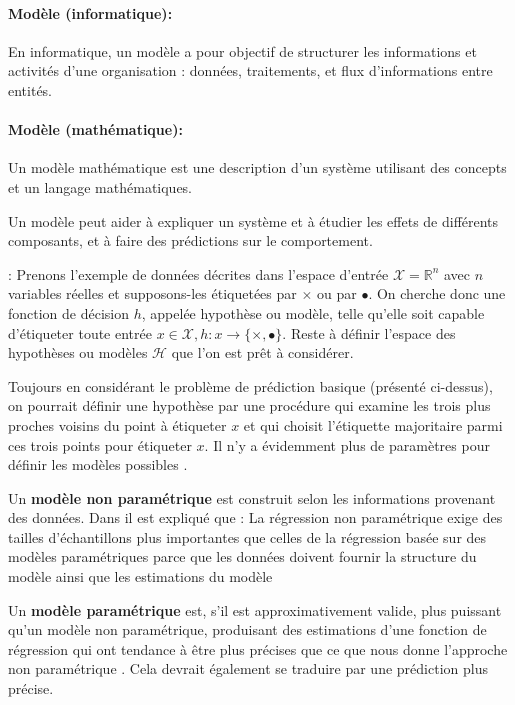	\paragraph*{Modèle (informatique):} En informatique, un modèle a pour objectif de structurer les informations et activités d'une organisation : données, traitements, et flux d'informations entre entités.
	
	\paragraph*{Modèle (mathématique):} Un modèle mathématique est une description d'un système utilisant des concepts et un langage mathématiques.
	
	Un modèle peut aider à expliquer un système et à étudier les effets de différents composants, et à faire des prédictions sur le comportement.
	
	
	\Eg: Prenons l'exemple de données décrites dans l'espace d'entrée $\mathcal{X} = \mathbb{R}^n$ avec $n$ variables réelles et supposons-les étiquetées par $\times$ ou par $\bullet$. On cherche donc une fonction de décision $h$, appelée hypothèse ou modèle, telle qu'elle soit capable d'étiqueter toute entrée 
	$x \in \mathcal{X}, h: x \rightarrow \{\times,\bullet\}$. Reste à définir l'espace des hypothèses ou modèles $\mathcal{H}$ que l'on est prêt à considérer.
	
	Toujours en considérant le problème de prédiction basique (présenté ci-dessus), on pourrait définir une hypothèse par une procédure qui examine les trois plus proches voisins du point à étiqueter $x$ et qui choisit l'étiquette majoritaire parmi ces trois points pour étiqueter $x$. Il n'y a évidemment plus de paramètres pour définir les modèles possibles \cite{antoine2018apprentissage}.
	
	Un \textbf{modèle non paramétrique} est construit selon les informations provenant des données. Dans \cite{antoine2018apprentissage} il est expliqué que : La régression non paramétrique exige des tailles d'échantillons plus importantes que celles de la régression basée sur des modèles paramétriques parce que les données doivent fournir la structure du modèle ainsi que les estimations du modèle
	
	Un \textbf{modèle paramétrique} est, s'il est approximativement valide, plus puissant qu'un modèle non paramétrique, produisant des estimations d'une fonction de régression qui ont tendance à être plus précises que ce que nous donne l'approche non paramétrique \cite{matloff2017statistical}. Cela devrait également se traduire par une prédiction plus précise. 
	
